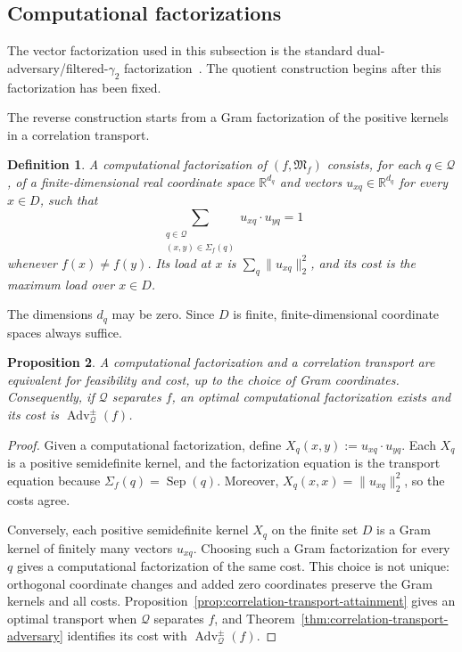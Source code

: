 \documentclass[11pt]{article}
\numberwithin{equation}{section}
\newtheorem{definition}{Definition}[section]
\newtheorem{proposition}[definition]{Proposition}
\theoremstyle{remark}
\begin{document}
\subsection{Computational factorizations}
\label{subsec:computational-factorizations}

The vector factorization used in this subsection is the standard dual-adversary/filtered-$\gamma_2$ factorization~\cite{Reichardt2009,LeeMittalReichardtSpalekSzegedy2011}. The quotient construction begins after this factorization has been fixed.

The reverse construction starts from a Gram factorization of the positive
kernels in a correlation transport.

\begin{definition}
\label{def:computational-factorization}
A \emph{computational factorization} of $(f,\mathfrak M_f)$ consists, for
each $q\in\mathcal Q$, of a finite-dimensional real coordinate space
$\mathbb R^{d_q}$ and vectors $u_{xq}\in\mathbb R^{d_q}$ for every
$x\in D$, such that
\begin{equation}
    \sum_{\substack{q\in\mathcal Q\\
                    (x,y)\in\Sigma_f(q)}}
        u_{xq}\mathbin{\cdot}u_{yq}
    =
    1
\end{equation}
whenever $f(x)\neq f(y)$. Its load at $x$ is
$\sum_q\|u_{xq}\|_2^2$, and its cost is the maximum load over $x\in D$.
\end{definition}

The dimensions $d_q$ may be zero. Since $D$ is finite, finite-dimensional
coordinate spaces always suffice.

\begin{proposition}
\label{prop:factorization-transport-equivalence}
A computational factorization and a correlation transport are equivalent
for feasibility and cost, up to the choice of Gram coordinates. Consequently,
if $\mathcal Q$ separates $f$, an optimal computational factorization exists
and its cost is $\operatorname{Adv}^{\pm}_{\mathcal Q}(f)$.
\end{proposition}

\begin{proof}
Given a computational factorization, define
$X_q(x,y):=u_{xq}\mathbin{\cdot}u_{yq}$. Each $X_q$ is a positive semidefinite kernel,
and the factorization equation is the transport equation because
$\Sigma_f(q)=\operatorname{Sep}(q)$. Moreover,
$X_q(x,x)=\|u_{xq}\|_2^2$, so the costs agree.

Conversely, each positive semidefinite kernel $X_q$ on the finite set $D$ is a Gram
kernel of finitely many vectors $u_{xq}$. Choosing such a Gram
factorization for every $q$ gives a computational factorization of the same
cost. This choice is not unique: orthogonal coordinate changes and added zero
coordinates preserve the Gram kernels and all costs. Proposition~\ref{prop:correlation-transport-attainment} gives an
optimal transport when $\mathcal Q$ separates $f$, and
Theorem~\ref{thm:correlation-transport-adversary} identifies its cost with
$\operatorname{Adv}^{\pm}_{\mathcal Q}(f)$.
\end{proof}
\end{document}
